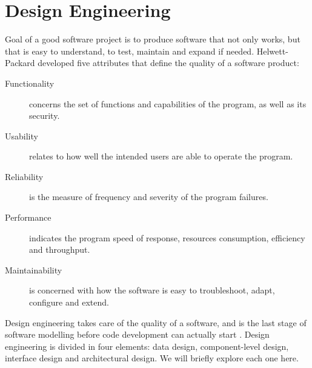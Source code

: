 \section{Design Engineering}
Goal of a good software project is to produce software that not only works, but
that is easy to understand, to test, maintain and expand if needed.
Helwett-Packard developed five attributes \cite{RG87} that define the quality of
a software product:
\begin{description}
\item [Functionality] concerns the set of functions and capabilities of the
program, as well as its security.
\item [Usability] relates to how well the intended users are able to operate the
program.
\item [Reliability] is the measure of frequency and severity of the program
failures.
\item [Performance] indicates the program speed of response, resources
consumption, efficiency and throughput.
\item [Maintainability] is concerned with how the software is easy to
troubleshoot, adapt, configure and extend.
\end{description}

Design engineering takes care of the quality of a software, and is the last
stage of software modelling before code development can actually start
\cite{RP05}.
Design engineering is divided in four elements: data design, component-level design,
interface design and architectural design. We will briefly explore each one
here.

